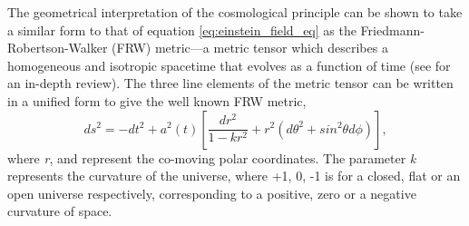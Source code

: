 The geometrical interpretation of the cosmological principle can be shown to take a similar form to that of equation \ref{eq:einstein_field_eq} as the Friedmann-Robertson-Walker (FRW) metric---a metric tensor which describes a homogeneous and isotropic spacetime that evolves as a function of time (see \cite{Modern_Cosmology, Gravity} for an in-depth review). The three line elements of the metric tensor can be written in a unified form to give the well known FRW metric,
%
\begin{equation}
  ds^2 = -dt^2 + a^2(t) \left[ \frac{dr^2}{1 - kr^2} +r^2(d\theta^2 + sin^2\theta d\phi) \right],
\end{equation}
%
where \textit{r}, \theta and \phi represent the co-moving polar coordinates. The parameter \textit{k} represents the curvature of the universe, where +1, 0, -1 is for a closed, flat or an open universe respectively, corresponding to a positive, zero or a negative curvature of space.

